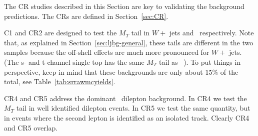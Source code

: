 The CR studies described in this Section are key to validating the
background predictions.  The CRs are defined in Section~\ref{sec:CR}.

C1 and CR2 are designed to test the $M_T$ tail in $W +$ jets and 
\ttbar\ respectively.  Note that, as explained in Section~\ref{sec:ljbg-general},
these tails are different in the two samples because the off-shell effects
are much more pronounced for $W +$ jets.  (The s- and t-channel single 
top has the same $M_T$ tail as \ttbar\ ).  To put things in perspective, 
keep in mind that these
backgrounds are only about 15\% of the total, see Table~\ref{tab:srrawmcyields}.

CR4 and CR5 address the dominant \ttbar\ dilepton background.
In CR4 we test the $M_T$ tail in well identified dilepton events.
In CR5 we test the same quantity, but in events where the second lepton is identified
as an isolated track.  Clearly CR4 and CR5 overlap.
